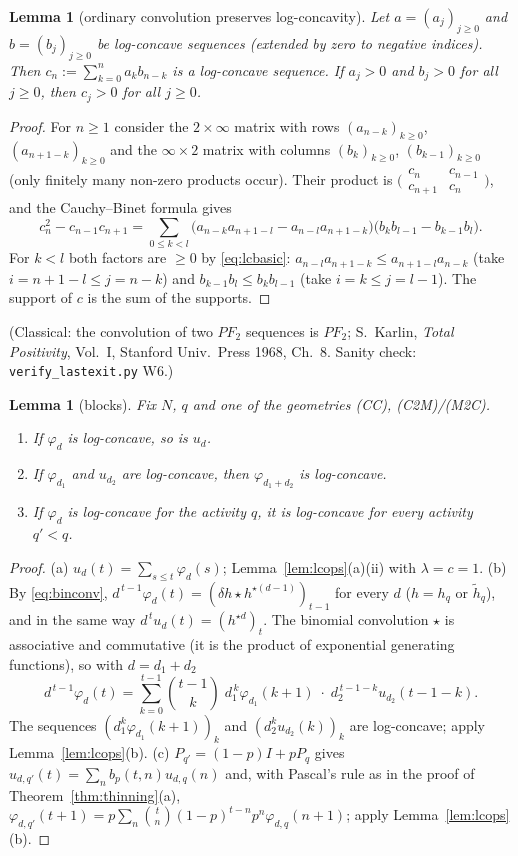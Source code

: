 \documentclass[11pt,a4paper]{article}
\newtheorem{lemma}[theorem]{Lemma}
\theoremstyle{definition}
\begin{document}
\begin{lemma}[ordinary convolution preserves log-concavity]\label{lem:conv}
Let $a=(a_j)_{j\ge0}$ and $b=(b_j)_{j\ge0}$ be log-concave sequences (extended by zero to negative indices). Then $c_n:=\sum_{k=0}^na_kb_{n-k}$ is a log-concave sequence. If $a_j>0$ and $b_j>0$ for all $j\ge0$, then $c_j>0$ for all $j\ge0$.
\end{lemma}
\begin{proof}
For $n\ge1$ consider the $2\times\infty$ matrix with rows $(a_{n-k})_{k\ge0}$, $(a_{n+1-k})_{k\ge0}$ and the $\infty\times2$ matrix with columns $(b_k)_{k\ge0}$, $(b_{k-1})_{k\ge0}$ (only finitely many non-zero products occur). Their product is $\bigl(\begin{smallmatrix}c_n&c_{n-1}\\c_{n+1}&c_n\end{smallmatrix}\bigr)$, and the Cauchy--Binet formula gives
\[
c_n^2-c_{n-1}c_{n+1}=\sum_{0\le k<l}\bigl(a_{n-k}a_{n+1-l}-a_{n-l}a_{n+1-k}\bigr)\bigl(b_kb_{l-1}-b_{k-1}b_l\bigr).
\]
For $k<l$ both factors are $\ge0$ by \eqref{eq:lcbasic}: $a_{n-l}a_{n+1-k}\le a_{n+1-l}a_{n-k}$ (take $i=n+1-l\le j=n-k$) and $b_{k-1}b_l\le b_kb_{l-1}$ (take $i=k\le j=l-1$). The support of $c$ is the sum of the supports.
\end{proof}
(Classical: the convolution of two $PF_2$ sequences is $PF_2$; S.~Karlin, \emph{Total Positivity}, Vol.~I, Stanford Univ.\ Press 1968, Ch.~8. Sanity check: \texttt{verify\_lastexit.py} W6.)

\begin{lemma}[blocks]\label{lem:blocks}
Fix $N$, $q$ and one of the geometries \textup{(CC)}, \textup{(C2M)/(M2C)}.
\begin{enumerate}
\item[(a)] If $\varphi_d$ is log-concave, so is $u_d$.
\item[(b)] If $\varphi_{d_1}$ and $u_{d_2}$ are log-concave, then $\varphi_{d_1+d_2}$ is log-concave.
\item[(c)] If $\varphi_d$ is log-concave for the activity $q$, it is log-concave for every activity $q'<q$.
\end{enumerate}
\end{lemma}
\begin{proof}
(a) $u_d(t)=\sum_{s\le t}\varphi_d(s)$; Lemma~\ref{lem:lcops}(a)(ii) with $\lambda=c=1$.
(b) By \eqref{eq:binconv}, $d^{\,t-1}\varphi_d(t)=(\delta h\star h^{\star(d-1)})_{t-1}$ for every $d$ ($h=h_q$ or $\tilde h_q$), and in the same way $d^{\,t}u_d(t)=(h^{\star d})_t$. The binomial convolution $\star$ is associative and commutative (it is the product of exponential generating functions), so with $d=d_1+d_2$
\[
d^{\,t-1}\varphi_d(t)=\sum_{k=0}^{t-1}\binom{t-1}k\;d_1^{\,k}\varphi_{d_1}(k+1)\;\cdot\;d_2^{\,t-1-k}u_{d_2}(t-1-k).
\]
The sequences $(d_1^k\varphi_{d_1}(k+1))_k$ and $(d_2^ku_{d_2}(k))_k$ are log-concave; apply Lemma~\ref{lem:lcops}(b).
(c) $P_{q'}=(1-p)I+pP_q$ gives $u_{d,q'}(t)=\sum_nb_p(t,n)u_{d,q}(n)$ and, with Pascal's rule as in the proof of Theorem~\ref{thm:thinning}(a), $\varphi_{d,q'}(t+1)=p\sum_n\binom tn(1-p)^{t-n}p^n\varphi_{d,q}(n+1)$; apply Lemma~\ref{lem:lcops}(b).
\end{proof}
\end{document}
